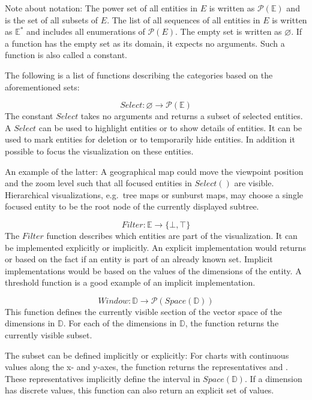Note about notation:
The power set of all entities in $E$ is written as $ \mathcal{P}(\mathbb{E})$ and is the set of all subsets of $E$.
The list of all sequences of all entities in $E$ is written as $ \mathbb{E^*} $ and includes all enumerations of $\mathcal{P}(E)$.
The empty set is written as $\varnothing$.
If a function has the empty set as its domain, it expects no arguments.
Such a function is also called a constant.

The following is a list of functions describing the categories based on the aforementioned sets:

\begin{equation} Select: \varnothing \rightarrow \mathcal{P}(\mathbb{E}) \end{equation}
  The constant $Select$ takes no arguments and returns a subset of selected entities.
  A $Select$ can be used to highlight entities or to show details of entities.
  It can be used to mark entities for deletion or to temporarily hide entities.
  In addition it possible to focus the visualization on these entities.

  An example of the latter:
  A geographical map could move the viewpoint position and the zoom level such that all focused entities in $Select()$ are visible.
  Hierarchical visualizations, e.g.\ tree maps or sunburst maps, may choose a single focused entity to be the root node of the currently displayed subtree.

\begin{equation} Filter: \mathbb{E} \rightarrow \{ \bot, \top \} \end{equation}
  The $Filter$ function describes which entities are part of the visualization.
  It can be implemented explicitly or implicitly.
  An explicit implementation would returns  or  based on the fact if an entity is part of an already known set.
  Implicit implementations would be based on the values of the dimensions of the entity.
  A threshold function is a good example of an implicit implementation.

\begin{equation} Window: \mathbb{D} \rightarrow \mathcal{P}(Space(\mathbb{D})) \end{equation}
  This function defines the currently visible section of the vector space of the dimensions in $\mathbb{D}$.
  For each of the dimensions in $\mathbb{D}$, the function returns the currently visible subset.

  The subset can be defined implicitly or explicitly:
  For charts with continuous values along the x- and y-axes, the function returns the representatives  and .
  These representatives implicitly define the interval in $Space(\mathbb{D})$.
  If a dimension has discrete values, this function can also return an explicit set of values.

